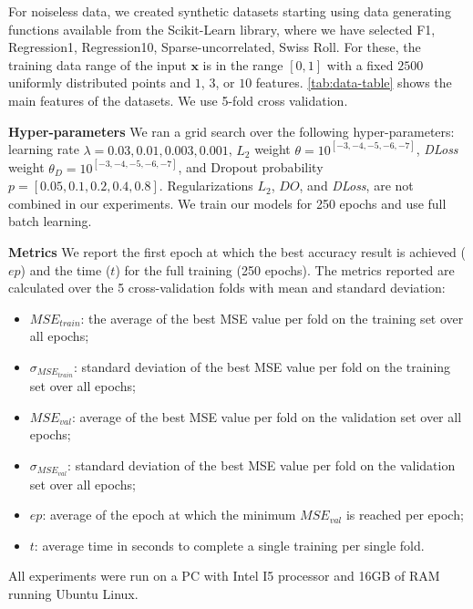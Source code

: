 \documentclass[conference]{IEEEtran}
\begin{document}
For noiseless data, we created synthetic datasets starting using data generating functions available from the Scikit-Learn library, where we have selected F1, Regression1, Regression10, Sparse-uncorrelated, Swiss Roll. 
For these, the training data range of the input $\mathbf{x}$ is in the range $[0,1]$ with a fixed $2500$ uniformly distributed points and $1$, $3$, or $10$ features.
\autoref{tab:data-table} shows the main features of the datasets.
We use 5-fold cross validation. 




\textbf{Hyper-parameters}
We ran a grid search over the following hyper-parameters: learning rate $\lambda = 0.03,0.01,0.003,0.001$, $L_2$ weight $\theta = 10^{[-3,-4,-5,-6,-7]}$, \emph{DLoss} weight $\theta_{D} = 10^{[-3,-4,-5,-6,-7]}$, and Dropout probability $p = [0.05,0.1,0.2,0.4,0.8]$.
Regularizations $L_2$, $DO$, and \emph{DLoss}, are not combined in our experiments. 
We train our models for 250 epochs and use full batch learning. 

\textbf{Metrics} We report the first epoch at which the best accuracy result is achieved ($ep$) and the time ($t$) for the full training (250 epochs).
The metrics reported are calculated over the 5 cross-validation folds with mean and standard deviation: 
\begin{itemize}
 \item \textbf{$MSE_{train}$}: the average of the best MSE value per fold on the training set over all epochs;
 \item \textbf{$\sigma_{{MSE}_{train}}$}: standard deviation of the best MSE value per fold on the training set over all epochs;
 \item \textbf{$MSE_{val}$}: average of the best MSE value per fold on the validation set over all epochs;
 \item \textbf{$\sigma_{{MSE}_{val}}$}: standard deviation of the best MSE value per fold on the validation set over all epochs;
 \item \textbf{$ep$}: average of the epoch at which the minimum $MSE_{val}$ is reached per epoch;
 \item \textbf{$t$}: average time in seconds to complete a single training per single fold.
\end{itemize}
All experiments were run on a PC with Intel I5 processor and 16GB of RAM running Ubuntu Linux. 

\end{document}

